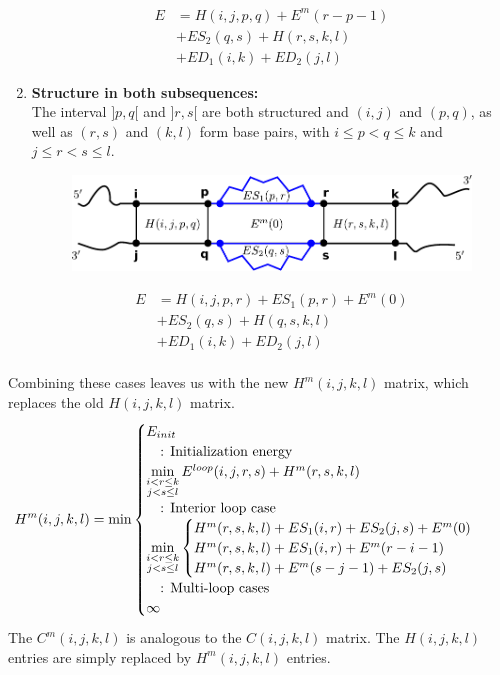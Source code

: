 \documentclass[11pt,a4paper]{report}
\begin{document}
\begin{enumerate}
\begin{figure}[H]
\end{figure}
\begin{align*}
E &= H(i,j,p,q) + E^m(r-p-1)\\
 &+ ES_2(q,s) + H(r,s,k,l)\\
 &+ ED_1(i,k) + ED_2(j,l) 
\end{align*}
\item \textbf{Structure in both subsequences:}\\
The interval $]p,q[$ and $]r,s[$ are both structured and $(i,j)$ and $(p,q)$, as well as $(r,s)$ and $(k,l)$ form base pairs, with $i \leq p < q \leq k$ and $j \leq r < s \leq l$.\\
\begin{figure}[H]
\centering
\includegraphics[scale=0.75]{RNAi2.pdf}
\end{figure}
\begin{align*}
E &= H(i,j,p,r) + ES_1(p,r) + E^m(0)\\
 & + ES_2(q,s) + H(q,s,k,l)\\
 & + ED_1(i,k) + ED_2(j,l)\\ 
\end{align*}
\end{enumerate}
Combining these cases leaves us with the new $H^m(i,j,k,l)$ matrix, which replaces the old $H(i,j,k,l)$ matrix.\\
\begin{equation*}
H^m(i,j,k,l) =  \min\begin{cases}
						E_{init}\\
						\quad\text{: Initialization energy}\\
						\min\limits_{\substack{i < r \leq k\\ j < s \leq l}} E^{loop}(i,j,r,s) + H^m(r,s,k,l)\\
						\quad\text{: Interior loop case}\\
						\min\limits_{\substack{i < r \leq k\\ j < s \leq l}}\begin{cases}
									H^m(r,s,k,l) + ES_1(i,r) + ES_2(j,s) + E^m(0)\\
									H^m(r,s,k,l) + ES_1(i,r) + E^m(r-i-1)\\
									H^m(r,s,k,l) + E^m(s-j-1) + ES_2(j,s)\\
						\end{cases}\\
						\quad\text{: Multi-loop cases}\\
   						\infty\\
			  \end{cases}\\
\end{equation*}
The $C^m(i,j,k,l)$ is analogous to the $C(i,j,k,l)$ matrix. The $H(i,j,k,l)$ entries are simply replaced by $H^m(i,j,k,l)$ entries.\\
\newpage
\end{document}
